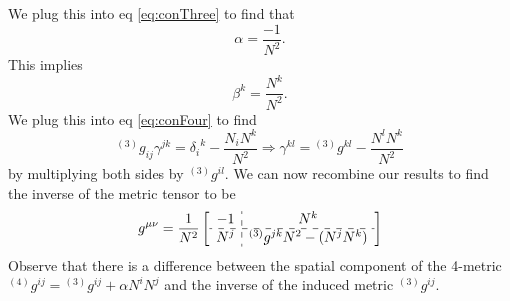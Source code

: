 We plug this into eq \eqref{eq:conThree} to find that
\begin{equation}%
\alpha = \frac{-1}{N^2}.
\end{equation}
This implies 
\begin{equation}%
\beta^{k} = \frac{N^{k}}{N^2}.
\end{equation}
We plug this into eq \eqref{eq:conFour} to find
\begin{equation}%
{}^{(3)}g_{ij}\gamma^{jk}={\delta_{i}}^{k}-\frac{N_{i}N^{k}}{N^2}\Rightarrow \gamma^{kl}={}^{(3)}g^{kl}-\frac{N^lN^k}{N^2}
\end{equation}
by multiplying both sides by ${}^{(3)}g^{il}$. We can now recombine our
results to find the inverse of the metric tensor to be
\begin{equation}%
g^{\mu\nu} =\frac{1}{N^2} \left[\begin{array}{c:c}
-1 & N^{k}\\\hdashline
N^{j} & {}^{(3)}g^{jk}N^2 - (N^jN^k)
\end{array}\right]
\end{equation}
Observe that there is a difference between the spatial component
of the 4-metric ${}^{(4)}g^{ij}={}^{(3)}g^{ij}+\alpha N^{i}N^{j}$ and the inverse
of the induced metric ${}^{(3)}g^{ij}$.

